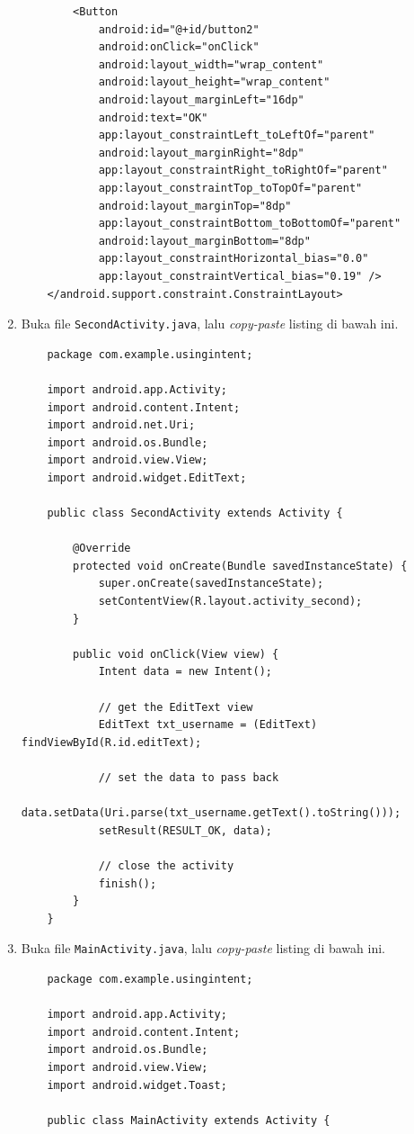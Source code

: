 \documentclass{scrartcl}
\begin{document}
\begin{enumerate}
\begin{verbatim}
		<Button
			android:id="@+id/button2"
			android:onClick="onClick"
			android:layout_width="wrap_content"
			android:layout_height="wrap_content"
			android:layout_marginLeft="16dp"
			android:text="OK"
			app:layout_constraintLeft_toLeftOf="parent"
			android:layout_marginRight="8dp"
			app:layout_constraintRight_toRightOf="parent"
			app:layout_constraintTop_toTopOf="parent"
			android:layout_marginTop="8dp"
			app:layout_constraintBottom_toBottomOf="parent"
			android:layout_marginBottom="8dp"
			app:layout_constraintHorizontal_bias="0.0"
			app:layout_constraintVertical_bias="0.19" />
	</android.support.constraint.ConstraintLayout>
	\end{verbatim}
	
	\item Buka file \texttt{SecondActivity.java}, lalu \textit{copy-paste} listing di bawah ini.
	
	\begin{verbatim}
	package com.example.usingintent;
	
	import android.app.Activity;
	import android.content.Intent;
	import android.net.Uri;
	import android.os.Bundle;
	import android.view.View;
	import android.widget.EditText;
	
	public class SecondActivity extends Activity {
		
		@Override
		protected void onCreate(Bundle savedInstanceState) {
			super.onCreate(savedInstanceState);
			setContentView(R.layout.activity_second);
		}
		
		public void onClick(View view) {
			Intent data = new Intent();
			
			// get the EditText view
			EditText txt_username = (EditText) findViewById(R.id.editText);
			
			// set the data to pass back
			data.setData(Uri.parse(txt_username.getText().toString()));
			setResult(RESULT_OK, data);
			
			// close the activity
			finish();
		}
	}
	\end{verbatim}
	
	\item Buka file \texttt{MainActivity.java}, lalu \textit{copy-paste} listing di bawah ini.
	\begin{verbatim}
	package com.example.usingintent;
	
	import android.app.Activity;
	import android.content.Intent;
	import android.os.Bundle;
	import android.view.View;
	import android.widget.Toast;
	
	public class MainActivity extends Activity {
		

\end{verbatim}
\end{enumerate}
\end{document}
